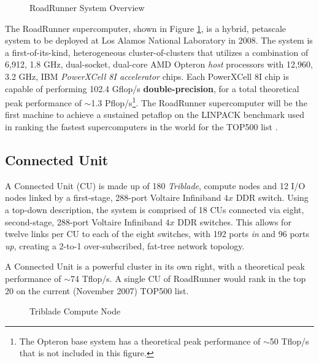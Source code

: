 \documentclass[letter,10pt]{article}
\begin{document}
\begin{figure}
    \begin{center}
    \scalebox{0.3}{}
    \caption{RoadRunner System Overview}
    \label{fig:system}
    \end{center}
\end{figure}

The RoadRunner supercomputer, shown in Figure \ref{fig:system},
is a hybrid, petascale system to be deployed at Los Alamos National
Laboratory in 2008.  The system is a first-of-its-kind, heterogeneous
cluster-of-clusters that utilizes a combination of 6,912, 1.8 GHz,
dual-socket, dual-core AMD Opteron \emph{host} processors with 12,960,
3.2 GHz, IBM \emph{PowerXCell 8I accelerator} chips.  Each PowerXCell 8I 
chip is capable of
performing 102.4 Gflop/s \textbf{double-precision}, for a total
theoretical peak performance of $\sim$1.3 Pflop/s\footnote{The Opteron
base system has a theoretical peak performance of $\sim$50 Tflop/s that
is not included in this figure.}.
The RoadRunner supercomputer will be the first machine to achieve a
sustained petaflop on the LINPACK benchmark used in ranking the
fastest supercomputers in the world for the TOP500 list \cite{top500}.

\subsection*{Connected Unit}

A Connected Unit (CU) is made up of 180 \emph{Triblade}, compute nodes and 12 I/O nodes linked by a first-stage, 288-port Voltaire Infiniband $4x$ DDR switch.  Using a top-down description, the system is comprised of 18 CUs connected via eight, second-stage, 288-port Voltaire Infiniband $4x$ DDR switches.  This allows for twelve links per CU to each of the eight switches, with 192 ports \emph{in} and 96 ports \emph{up}, creating a 2-to-1 over-subscribed, fat-tree network topology.

A Connected Unit is a powerful cluster in 
its own right, with a theoretical peak performance of
$\sim$74 Tflop/s.  A single CU of RoadRunner would rank in the
top 20 on the current (November 2007) TOP500 list.

\begin{figure}
    \begin{center}
    \scalebox{0.2}{}
    \caption{Triblade Compute Node}
    \label{fig:triblade}
    \end{center}
\end{figure}
\end{document}
